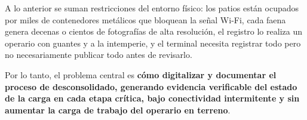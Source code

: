 A lo anterior se suman restricciones del entorno físico: los patios están ocupados por miles de
contenedores metálicos que bloquean la señal Wi-Fi, cada faena genera decenas o cientos de
fotografías de alta resolución, el registro lo realiza un operario con guantes y a la intemperie, y
el terminal necesita registrar todo pero no necesariamente publicar todo antes de revisarlo.

Por lo tanto, el problema central es \textbf{cómo digitalizar y documentar el proceso de
desconsolidado, generando evidencia verificable del estado de la carga en cada etapa crítica, bajo
conectividad intermitente y sin aumentar la carga de trabajo del operario en terreno}.
